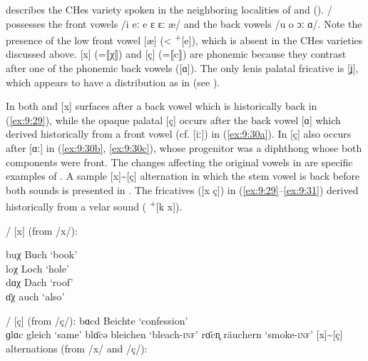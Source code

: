 \citet{Knauss1906} describes the CHes variety spoken in the neighboring localities of  and  (). / possesses the front vowels /i eː e ɛ ɛː æ/ and the back vowels /u o ɔː ɑ/. Note the presence of the low front vowel [æ] (< \textsuperscript{+}[e]), which is absent in the CHes varieties discussed above. [x] (=⟦χ⟧) and [ç] (=⟦c⟧) are phonemic because they contrast after one of the phonemic back vowels ([ɑ]). The only lenis palatal fricative is [ʝ], which appears to have a distribution as in  (see ).

In both  and  [x] surfaces after a back vowel which is historically back in (\ref{ex:9:29}), while the opaque palatal [ç] occurs after the back vowel [ɑ] which derived historically from a front vowel (cf.  [iː]) in (\ref{ex:9:30a}). In  [ç] also occurs after [ɑː] in (\ref{ex:9:30b}, \ref{ex:9:30c}), whose progenitor was a diphthong whose both components were front. The changes affecting the original vowels in  are specific examples of . A sample [x]{\textasciitilde}[ç] alternation in which the stem vowel is back before both sounds is presented in . The fricatives ([x ç]) in (\ref{ex:9:29}--\ref{ex:9:31}) derived historically from a velar sound ( \textsuperscript{+}[k x]).

\ea%
\label{ex:9:29}/ [x] (from /x/):\\
\begin{xlist}
  \sn
buχ \tab [bux] \tab Buch \tab ‘book’ \\
loχ \tab [lox] \tab Loch \tab ‘hole’ \\
dɑχ \tab [dɑx] \tab Dach \tab ‘roof’ \\
ɑ̄χ \tab  [ɑːx] \tab auch \tab ‘also’ \\
\end{xlist}
\z 

\ea%
\label{ex:9:30}/ [ç] (from /ç/):
\ea\label{ex:9:30a} bɑcd \tab [bɑçt] \tab Beichte \tab ‘confession’  \\
    ɡlɑc \tab [glɑç] \tab gleich \tab ‘same’ 
\ex\label{ex:9:30b} blɑ̄cə \tab [blɑːçə] \tab bleichen \tab ‘bleach-\textsc{inf}’ 
\ex\label{ex:9:30c} rɑ̄cn̥ \tab [rɑːçn̩] \tab räuchern \tab ‘smoke-\textsc{inf}’ 
    \z
\ex%
\label{ex:9:31} [x]{\textasciitilde}[ç] alternations (from /x/ and /ç/):\\

